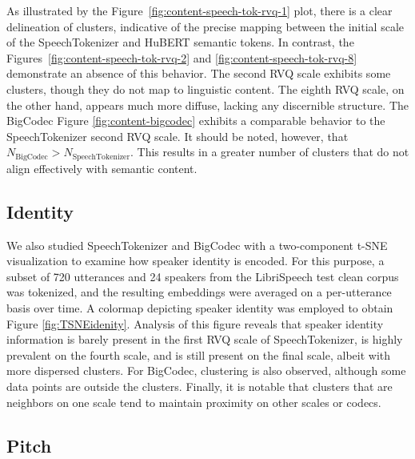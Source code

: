 \documentclass{Interspeech}
\begin{document}
As illustrated by the Figure~\ref{fig:content-speech-tok-rvq-1} plot, there is a clear delineation of clusters, indicative of the precise mapping between the initial scale of the SpeechTokenizer and HuBERT semantic tokens. In contrast, the Figures~\ref{fig:content-speech-tok-rvq-2} and \ref{fig:content-speech-tok-rvq-8} demonstrate an absence of this behavior.  The second RVQ scale exhibits some clusters, though they do not map to linguistic content. The eighth RVQ scale, on the other hand, appears much more diffuse, lacking any discernible structure. The BigCodec Figure \ref{fig:content-bigcodec}  exhibits a comparable behavior to the SpeechTokenizer second RVQ scale. It should be noted, however, that  $N_{\text{BigCodec}}>N_{\text{SpeechTokenizer}}$. This results in a greater number of clusters that do not align effectively with semantic content.


\subsection{Identity}

We also studied SpeechTokenizer and BigCodec with a two-component t-SNE visualization to examine how speaker identity is encoded. For this purpose, a subset of 720 utterances and 24 speakers from the LibriSpeech test clean corpus was tokenized, and the resulting embeddings were averaged on a per-utterance basis over time. A colormap depicting speaker identity was employed to obtain Figure \ref{fig:TSNEidenity}. Analysis of this figure reveals that speaker identity information is barely present in the first RVQ scale of SpeechTokenizer, is highly prevalent on the fourth scale, and is still present on the final scale, albeit with more dispersed clusters. For BigCodec, clustering is also observed, although some data points are outside the clusters. Finally, it is notable that clusters that are neighbors on one scale tend to maintain proximity on other scales or codecs.


\subsection{Pitch}
\end{document}

